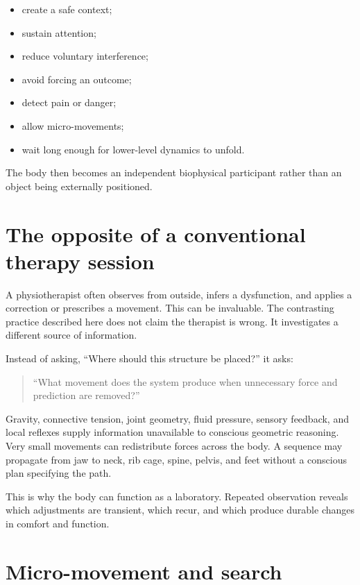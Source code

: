 \begin{itemize}
\tightlist
\item
  create a safe context;
\item
  sustain attention;
\item
  reduce voluntary interference;
\item
  avoid forcing an outcome;
\item
  detect pain or danger;
\item
  allow micro-movements;
\item
  wait long enough for lower-level dynamics to unfold.
\end{itemize}

The body then becomes an independent biophysical participant rather than an object being externally positioned.

\section{The opposite of a conventional therapy session}

A physiotherapist often observes from outside, infers a dysfunction, and applies a correction or prescribes a movement. This can be invaluable. The contrasting practice described here does not claim the therapist is wrong. It investigates a different source of information.

Instead of asking, ``Where should this structure be placed?'' it asks:

\begin{quote}
``What movement does the system produce when unnecessary force and prediction are removed?''
\end{quote}

Gravity, connective tension, joint geometry, fluid pressure, sensory feedback, and local reflexes supply information unavailable to conscious geometric reasoning. Very small movements can redistribute forces across the body. A sequence may propagate from jaw to neck, rib cage, spine, pelvis, and feet without a conscious plan specifying the path.

This is why the body can function as a laboratory. Repeated observation reveals which adjustments are transient, which recur, and which produce durable changes in comfort and function.

\section{Micro-movement and search}

